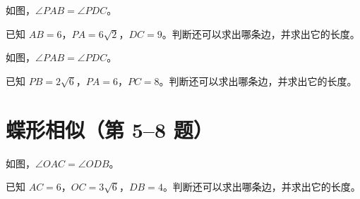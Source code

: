 \documentclass{exam-zh}
\begin{document}
\begin{problem}[points=10]
  \noindent
  \begin{minipage}[t]{\dimexpr\linewidth-60mm-6mm\relax}
    \vspace{0pt}
    如图，$\angle PAB=\angle PDC$。

已知 $AB=6$，$PA=6\sqrt{2}$，$DC=9$。判断还可以求出哪条边，并求出它的长度。
    
  \end{minipage}\hfill
  \begin{diagramcoltikz}{60mm}{}
  }
  \end{diagramcoltikz}
  \par\medskip
  \answerarea[54mm]
\end{problem}



\begin{problem}[points=10]
  \noindent
  \begin{minipage}[t]{\dimexpr\linewidth-60mm-6mm\relax}
    \vspace{0pt}
    如图，$\angle PAB=\angle PDC$。

已知 $PB=2\sqrt{6}$，$PA=6$，$PC=8$。判断还可以求出哪条边，并求出它的长度。
    
  \end{minipage}\hfill
  \begin{diagramcoltikz}{60mm}{}
  }
  \end{diagramcoltikz}
  \par\medskip
  \answerarea[54mm]
\end{problem}


\section*{蝶形相似（第 5–8 题）}


\begin{problem}[points=10]
  \noindent
  \begin{minipage}[t]{\dimexpr\linewidth-60mm-6mm\relax}
    \vspace{0pt}
    如图，$\angle OAC=\angle ODB$。

已知 $AC=6$，$OC=3\sqrt{6}$，$DB=4$。判断还可以求出哪条边，并求出它的长度。
    
  \end{minipage}\hfill
  \begin{diagramcoltikz}{60mm}{}
  }
  \end{diagramcoltikz}
  \par\medskip
  \answerarea[54mm]
\end{problem}
\end{document}
